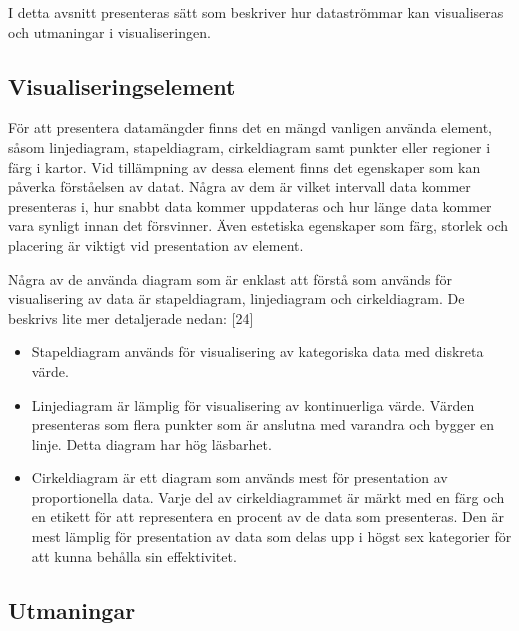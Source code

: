 \documentclass{kththesis}
\begin{document}
I detta avsnitt presenteras sätt som beskriver hur dataströmmar kan visualiseras och utmaningar i visualiseringen. 

\subsection{Visualiseringselement}

För att presentera datamängder finns det en mängd vanligen använda element, såsom linjediagram, stapeldiagram, cirkeldiagram samt punkter eller regioner i färg i kartor. Vid tillämpning av dessa element finns det egenskaper som kan påverka förståelsen av datat. Några av dem är vilket intervall data kommer presenteras i, hur snabbt data kommer uppdateras och hur länge data kommer vara synligt innan det försvinner. Även estetiska egenskaper som färg, storlek och placering är viktigt vid presentation av element.

Några av de använda diagram som är enklast att förstå som används för visualisering av data är stapeldiagram, linjediagram och cirkeldiagram. De beskrivs lite mer detaljerade nedan: [24]
\begin{itemize}
\item Stapeldiagram används för visualisering av kategoriska data med diskreta värde.
\item Linjediagram är lämplig för visualisering av kontinuerliga värde. Värden presenteras som flera punkter som är anslutna med varandra och bygger en linje. Detta diagram har hög läsbarhet.
\item Cirkeldiagram är ett diagram som används mest för presentation av proportionella data. Varje del av cirkeldiagrammet är märkt med en färg och en etikett för att representera en procent av de data som presenteras. Den är mest lämplig för presentation av data som delas upp i högst sex kategorier för att kunna behålla sin effektivitet. 
\end{itemize}	

\subsection{Utmaningar}
\end{document}
